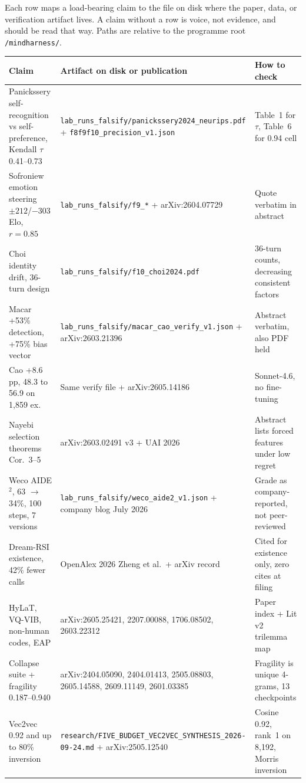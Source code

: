 Each row maps a load-bearing claim to the file on disk where the paper, data, or verification artifact lives. A claim without a row is voice, not evidence, and should be read that way. Paths are relative to the programme root \texttt{/mindharness/}.

\begin{center}
\scriptsize
\begin{tabular}{p{3.6cm}p{5.2cm}p{4.4cm}}
\toprule
Claim & Artifact on disk or publication & How to check \\
\midrule
Panickssery self-recognition vs self-preference, Kendall $\tau$ 0.41--0.73 & \texttt{lab\_runs\_falsify/panickssery2024\_neurips.pdf} + \texttt{f8f9f10\_precision\_v1.json} & Table~1 for $\tau$, Table~6 for 0.94 cell \\
Sofroniew emotion steering $\pm212$/$-$303 Elo, $r=0.85$ & \texttt{lab\_runs\_falsify/f9\_*} + arXiv:2604.07729 & Quote verbatim in abstract \\
Choi identity drift, 36-turn design & \texttt{lab\_runs\_falsify/f10\_choi2024.pdf} & 36-turn counts, decreasing consistent factors \\
Macar +53\% detection, +75\% bias vector & \texttt{lab\_runs\_falsify/macar\_cao\_verify\_v1.json} + arXiv:2603.21396 & Abstract verbatim, also PDF held \\
Cao +8.6\,pp, 48.3 to 56.9 on 1,859 ex. & Same verify file + arXiv:2605.14186 & Sonnet-4.6, no fine-tuning \\
Nayebi selection theorems Cor.\ 3--5 & arXiv:2603.02491 v3 + UAI 2026 & Abstract lists forced features under low regret \\
Weco AIDE$^{2}$, 63 $\to$ 34\%, 100 steps, 7 versions & \texttt{lab\_runs\_falsify/weco\_aide2\_v1.json} + company blog July 2026 & Grade as company-reported, not peer-reviewed \\
Dream-RSI existence, 42\% fewer calls & OpenAlex 2026 Zheng et al.\ + arXiv record \cite{dreamrsi2026} & Cited for existence only, zero cites at filing \\
HyLaT, VQ-VIB, non-human codes, EAP & arXiv:2605.25421, 2207.00088, 1706.08502, 2603.22312 & Paper index + Lit v2 trilemma map \\
Collapse suite + fragility 0.187--0.940 & arXiv:2404.05090, 2404.01413, 2505.08803, 2605.14588, 2609.11149, 2601.03385 & Fragility is unique 4-grams, 13 checkpoints \\
Vec2vec 0.92 and up to 80\% inversion & \texttt{research/FIVE\_BUDGET\_VEC2VEC\_SYNTHESIS\_2026-09-24.md} + arXiv:2505.12540 \cite{jha2025} & Cosine 0.92, rank~1 on 8,192, Morris inversion \\

\end{tabular}
\end{center}
